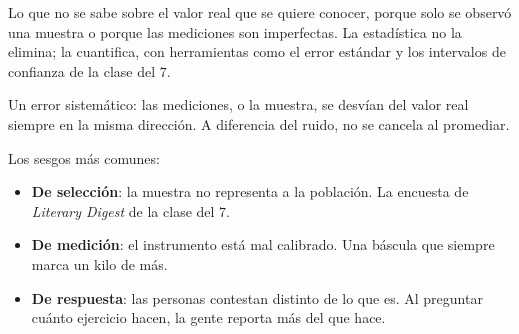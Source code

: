 \documentclass[11pt,letterpaper]{article}
\begin{document}
\begin{definicion}[Incertidumbre]
    Lo que no se sabe sobre el valor real que se quiere conocer, porque
    solo se observó una muestra o porque las mediciones son
    imperfectas. La estadística no la elimina; la cuantifica, con
    herramientas como el error estándar y los intervalos de confianza
    de la clase del $7$.
\end{definicion}

\begin{definicion}[Sesgo]
    Un error sistemático: las mediciones, o la muestra, se desvían del
    valor real siempre en la misma dirección. A diferencia del ruido,
    no se cancela al promediar.
\end{definicion}

Los sesgos más comunes:

\begin{itemize}[itemsep=0.3em]
    \item \textbf{De selección}: la muestra no representa a la
          población. La encuesta de \textit{Literary Digest} de la
          clase del $7$.
    \item \textbf{De medición}: el instrumento está mal calibrado. Una
          báscula que siempre marca un kilo de más.
    \item \textbf{De respuesta}: las personas contestan distinto de lo
          que es. Al preguntar cuánto ejercicio hacen, la gente
          reporta más del que hace.
\end{itemize}

\begin{center}
\end{center}
\end{document}
